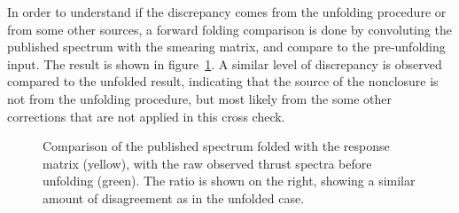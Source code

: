 In order to understand if the discrepancy comes from the unfolding procedure or from some other sources, a forward folding comparison is done by convoluting the published spectrum with the smearing matrix, and compare to the pre-unfolding input.  The result is shown in figure~\ref{Figure:CrossCheck-FoldedThrust}.  A similar level of discrepancy is observed compared to the unfolded result, indicating that the source of the nonclosure is not from the unfolding procedure, but most likely from the some other corrections that are not applied in this cross check.
%
\begin{figure}[htp!]
    \centering
    \caption{Comparison of the published spectrum folded with the response matrix (yellow), with the raw observed thrust spectra before unfolding (green).  The ratio is shown on the right, showing a similar amount of disagreement as in the unfolded case.}
    \label{Figure:CrossCheck-FoldedThrust}
\end{figure}


\clearpage


